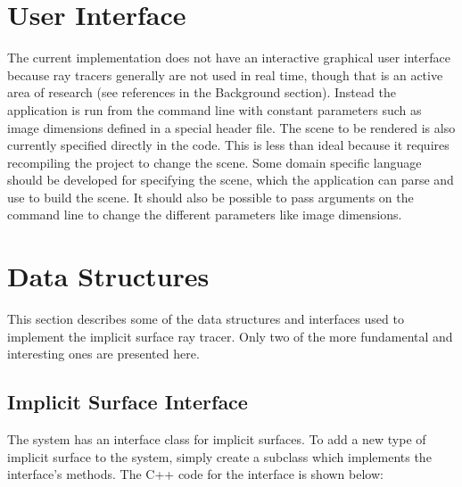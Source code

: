 \documentclass[conference]{acmsiggraph}
\begin{document}
\section{User Interface}

The current implementation does not have an interactive graphical user 
interface because ray tracers generally are not used in real time,
though that is an active area of research (see references in the Background
section).  Instead the application is run from the command line with constant 
parameters such as image dimensions defined in a special header file.
The scene to be rendered is also currently specified directly in the 
code.  This is less than ideal because it requires recompiling the project to 
change the scene.  Some domain specific language should be developed
for specifying the scene, which the application can parse and
use to build the scene.  It should also be possible to pass arguments
on the command line to change the different parameters like
image dimensions.

\section{Data Structures}

This section describes some of the data structures and interfaces 
used to implement the implicit surface ray tracer.  Only two of the 
more fundamental and interesting ones are presented here.

\subsection{Implicit Surface Interface}

The system has an interface class for implicit surfaces.  To add a new
type of implicit surface to the system, simply create a subclass
which implements the interface's methods.  The C++ code for the interface
is shown below:
\end{document}
